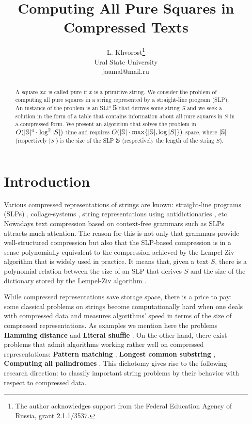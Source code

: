 ﻿\documentclass[11pt]{article}
\begin{document}
\title{Computing All Pure Squares in Compressed Texts}
\author{L. Khvorost\thanks{The author acknowledges support from the Federal
Education Agency of Russia, grant  2.1.1/3537.}\\
Ural State University\\
jaamal@mail.ru}
\date{}
\maketitle

\begin{abstract}
A square $xx$ is called pure if $x$ is a primitive string. We consider the problem of computing all pure squares
in a string represented by a straight-line program (SLP). An instance of the problem is an SLP $\mathbb{S}$ that
derives some string $S$ and we seek a solution in the form of a table that contains information about all pure
squares in $S$ in a compressed form. We present an algorithm that solves the problem in $O(|\mathbb{S}|^4\cdot
\log^2{|S|})$ time and requires $O(|\mathbb{S}|\cdot \max\{ |\mathbb{S}|, \log{|S|}\})$ space, where $|\mathbb{S}|$
(respectively $|S|$) is the size of the SLP $\mathbb{S}$ (respectively the length of the string $S$).
\end{abstract} 

\section{Introduction}

Various compressed representations of strings are known: straight-line programs (SLPs) \cite{14,15,16,18},
collage-systems \cite{12}, string representations using antidictionaries \cite{13}, etc. Nowadays text compression
based on context-free grammars such as SLPs attracts much attention. The reason for this is not only that grammars
provide well-structured compression but also that the SLP-based compression is in a sense polynomially equivalent
to the compression achieved by the Lempel-Ziv algorithm that is widely used in practice. It means that, given a
text $S$, there is a polynomial relation between the size of an SLP that derives $S$ and the size of the
dictionary stored by the Lempel-Ziv algorithm \cite{18}.

While compressed representations save storage space, there is a price to pay: some classical problems on strings
become computationally hard when one deals with compressed data and measures algorithms' speed in terms of the
size of compressed representations. As examples we mention here the problems \textbf{Hamming distance} \cite{15} and
\textbf{Literal shuffle} \cite{4}. On the other hand, there exist problems that admit algorithms working rather well on
compressed representations: \textbf{Pattern matching} \cite{15, 10}, \textbf{Longest common substring} \cite{16}, 
\textbf{Computing all palindromes} \cite{16}. This dichotomy gives rise to the following research direction: to
classify important string problems by their behavior with respect to compressed data.
\end{document}
